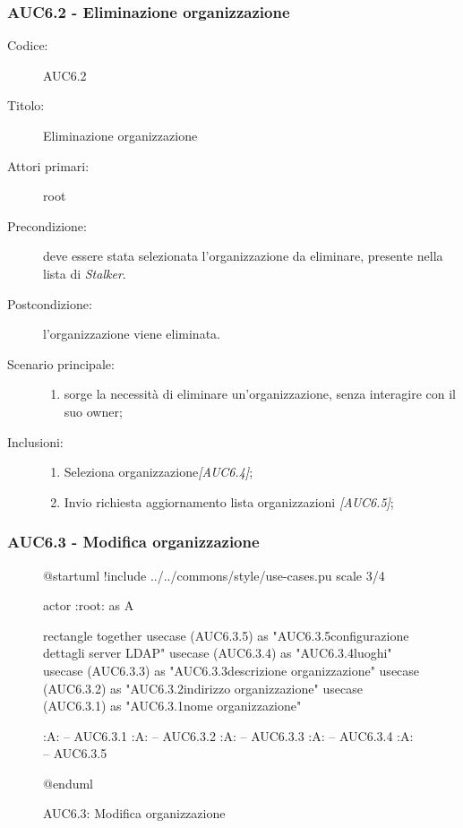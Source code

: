 \documentclass[casi-duso]{subfiles}
\begin{document}
\subsubsection{AUC6.2 - Eliminazione organizzazione}%
\label{subsub:AUC6.2}
\begin{description}
  \item[Codice:] AUC6.2
  \item[Titolo:] Eliminazione organizzazione
  \item[Attori primari:] root
  \item[Precondizione:] deve essere stata selezionata l'organizzazione da eliminare, presente nella lista di \emph{Stalker}.
  \item[Postcondizione:] l'organizzazione viene eliminata.
  \item[Scenario principale:]
  \begin{enumerate}
    \item sorge la necessità di eliminare un'organizzazione, senza interagire con il suo owner;
  \end{enumerate}
  \item[Inclusioni:]
  \begin{enumerate}
    \item Seleziona organizzazione\emph{[AUC6.4]};
    \item Invio richiesta aggiornamento lista organizzazioni \emph{[AUC6.5]};
  \end{enumerate}
\end{description}

\subsubsection{AUC6.3 - Modifica organizzazione}%
\label{subsub:AUC6.3}

\begin{figure}[h!]
  \centering
  \begin{plantuml}
  @startuml
  !include ../../commons/style/use-cases.pu
  scale 3/4

  actor :root: as A

  rectangle {
    together {
      usecase (AUC6.3.5) as "AUC6.3.5\nModifica configurazione dettagli server LDAP"
      usecase (AUC6.3.4) as "AUC6.3.4\nGestione luoghi"
      usecase (AUC6.3.3) as "AUC6.3.3\nModifica descrizione organizzazione"
      usecase (AUC6.3.2) as "AUC6.3.2\nModifica indirizzo organizzazione"
      usecase (AUC6.3.1) as "AUC6.3.1\nModifica nome organizzazione"
    }
  }

  :A: -- AUC6.3.1
  :A: -- AUC6.3.2
  :A: -- AUC6.3.3
  :A: -- AUC6.3.4
  :A: -- AUC6.3.5

  @enduml
  \end{plantuml}
  \caption{AUC6.3: Modifica organizzazione}
  \label{fig:auc6_3}
\end{figure}
\end{document}
